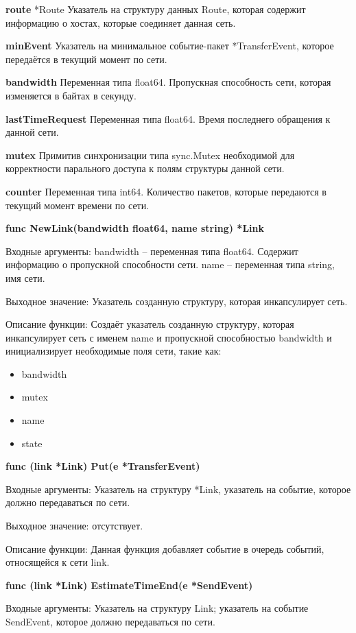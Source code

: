\textbf{route}	 *Route
Указатель на структуру данных Route, которая содержит информацию о хостах, которые соединяет данная сеть. 

\textbf{minEvent}	
Указатель на минимальное событие-пакет *TransferEvent, которое передаётся в текущий момент по сети. 

\textbf{bandwidth}	 
Переменная типа float64. Пропускная способность сети, которая изменяется в байтах в секунду. 

\textbf{lastTimeRequest}
Переменная типа float64. Время последнего обращения к данной сети.

\textbf{mutex}	           
Примитив синхронизации типа sync.Mutex необходимой для корректности парального доступа к полям структуры данной сети.
 
\textbf{counter}
Переменная типа int64. Количество пакетов, которые передаются в текущий момент времени по сети. 


\textbf{func NewLink(bandwidth float64, name string) *Link}

Входные аргументы: bandwidth -- переменная типа float64. Содержит информацию о пропускной способности сети. name -- переменная типа string, имя сети. 

Выходное значение: Указатель созданную структуру, которая инкапсулирует сеть. 

Описание функции: Создаёт указатель созданную структуру, которая инкапсулирует сеть с именем name и пропускной способностью bandwidth и инициализирует необходимые поля сети, такие как:

\begin{itemize}
\item bandwidth 
\item mutex    
\item name   
\item state  
\end{itemize}




\textbf{func (link *Link) Put(e *TransferEvent)}

Входные аргументы: Указатель на структуру *Link, указатель на событие, которое должно передаваться по сети.

Выходное значение: отсутствует.

Описание функции: Данная функция добавляет событие в очередь событий, относящейся к сети link. 


\textbf{func (link *Link) EstimateTimeEnd(e *SendEvent)}

Входные аргументы: Указатель на структуру Link; указатель на событие SendEvent, которое должно передаваться по сети.

